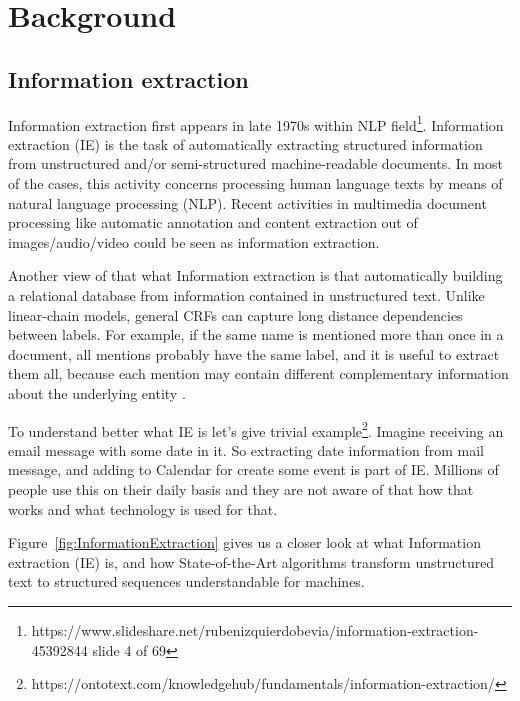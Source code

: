 \documentclass[thesis=M,english]{FITthesis}[2018/05/30]
\begin{document}
	
\section{Background}

\subsection{Information extraction}
	Information extraction first appears in late 1970s within NLP field\footnote{https://www.slideshare.net/rubenizquierdobevia/information-extraction-45392844 slide 4 of 69}. 
Information extraction (IE) \cite{wiki:IE} is the task of automatically extracting structured information from unstructured and/or semi-structured machine-readable documents. In most of the cases, this activity concerns processing human language texts by means of natural language processing (NLP). Recent activities in multimedia document processing like automatic annotation and content extraction out of images/audio/video could be seen as information extraction.

	Another view of that what Information extraction is that automatically building a relational database from information contained in unstructured text. Unlike linear-chain models, general CRFs can capture long distance dependencies between labels. For example, if the same name is mentioned more than once in a document, all mentions probably have the same label, and it is useful to extract them all, because each mention may contain different complementary information about the underlying entity \cite{article:IE}.

	To understand better what IE is let's give trivial example\footnote{https://ontotext.com/knowledgehub/fundamentals/information-extraction/}. Imagine receiving an email message with some date in it. So extracting date information from mail message, and adding to Calendar for create some event is part of IE. Millions of people use this on their daily basis and they are not aware of that how that works and what technology is used for that.

	Figure~\ref{fig:InformationExtraction} gives us a closer look at what Information extraction (IE) is, and how State-of-the-Art algorithms transform unstructured text to structured sequences understandable for machines. 
\end{document}
